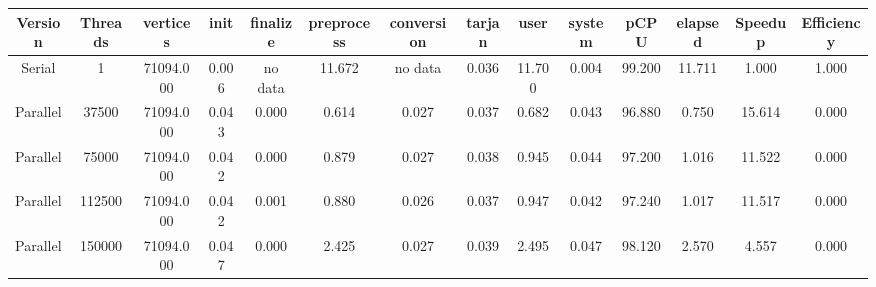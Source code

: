 \begin{tabular}{|c|c|c|c|c|c|c|c|c|c|c|c|c|c|}
\toprule
 Version &  Threads &   vertices &  init & finalize &  preprocess & conversion &  tarjan &   user &  system &   pCPU &  elapsed &  Speedup &  Efficiency \\
\midrule
  Serial &        1 &  71094.000 & 0.006 &  no data &      11.672 &    no data &   0.036 & 11.700 &   0.004 & 99.200 &   11.711 &    1.000 &       1.000 \\
Parallel &    37500 &  71094.000 & 0.043 &    0.000 &       0.614 &      0.027 &   0.037 &  0.682 &   0.043 & 96.880 &    0.750 &   15.614 &       0.000 \\
Parallel &    75000 &  71094.000 & 0.042 &    0.000 &       0.879 &      0.027 &   0.038 &  0.945 &   0.044 & 97.200 &    1.016 &   11.522 &       0.000 \\
Parallel &   112500 &  71094.000 & 0.042 &    0.001 &       0.880 &      0.026 &   0.037 &  0.947 &   0.042 & 97.240 &    1.017 &   11.517 &       0.000 \\
Parallel &   150000 &  71094.000 & 0.047 &    0.000 &       2.425 &      0.027 &   0.039 &  2.495 &   0.047 & 98.120 &    2.570 &    4.557 &       0.000 \\
\bottomrule
\end{tabular}
